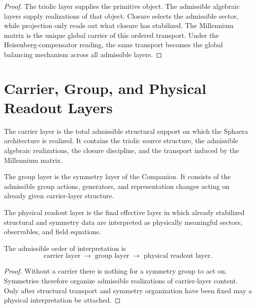 \begin{proof}
The triolic layer supplies the primitive object. The admissible algebraic
layers supply realizations of that object. Closure selects the admissible
sector, while projection only reads out what closure has stabilized. The
Millennium matrix is the unique global carrier of this ordered transport.
Under the Heisenberg-compensator reading, the same transport becomes the
global balancing mechanism across all admissible layers.
\end{proof}

\section{Carrier, Group, and Physical Readout Layers}
\label{sec:carrier-group-readout}

\begin{definition}
The carrier layer is the total admissible structural support on which the
Sphaera architecture is realized. It contains the triolic source structure,
the admissible algebraic realizations, the closure discipline, and the
transport induced by the Millennium matrix.
\end{definition}

\begin{definition}
The group layer is the symmetry layer of the Companion. It consists of the
admissible group actions, generators, and representation changes acting on
already given carrier-layer structure.
\end{definition}

\begin{definition}
The physical readout layer is the final effective layer in which already
stabilized structural and symmetry data are interpreted as physically
meaningful sectors, observables, and field equations.
\end{definition}

\begin{theorem}
\label{thm:carrier-group-readout-order}
The admissible order of interpretation is
\[
\text{carrier layer}
\;\longrightarrow\;
\text{group layer}
\;\longrightarrow\;
\text{physical readout layer}.
\]
\end{theorem}

\begin{proof}
Without a carrier there is nothing for a symmetry group to act on. Symmetries
therefore organize admissible realizations of carrier-layer content. Only
after structural transport and symmetry organization have been fixed may a
physical interpretation be attached.
\end{proof}

